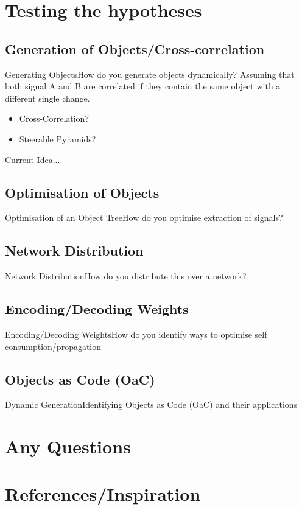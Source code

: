 \documentclass{beamer}
\begin{document}
  \section{Testing the hypotheses}
  \subsection{Generation of  Objects/Cross-correlation}
  \begin{frame}[t]{Generating Objects}{How do you generate objects dynamically?}
    Assuming that both signal A and B are correlated if they contain the same object with a different single change.
    \begin{itemize}
      \item Cross-Correlation?
      \item Steerable Pyramids?
    \end{itemize}

    Current Idea...

    \begin{tikzpicture}

    \end{tikzpicture}
  \end{frame}
  \subsection{Optimisation of Objects }
  \begin{frame}{Optimisation of an Object Tree}{How do you optimise extraction of signals?}

  \end{frame}
  \subsection{Network Distribution}
  \begin{frame}{Network Distribution}{How do you distribute this over a network?}

  \end{frame}
  \subsection{Encoding/Decoding Weights}
  \begin{frame}{Encoding/Decoding Weights}{How do you identify ways to optimise self consumption/propagation}

  \end{frame}
  \subsection{Objects as Code (OaC)}
\begin{frame}{Dynamic Generation}{Identifying Objects as Code (OaC) and their applications}

\end{frame}
\section{Any Questions}
\section{References/Inspiration}
\begin{frame}

\end{frame}
\end{document}
